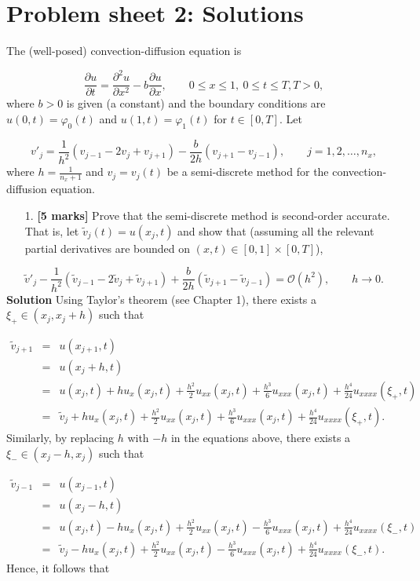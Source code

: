 \documentclass[12pt,a4paper]{article}
\begin{document}
\section{Problem sheet 2: Solutions}
The (well-posed) convection-diffusion equation is 

\[
\frac{\partial u}{\partial t} = \frac{\partial^2 u}{\partial x^2} - b \frac{\partial u}{\partial x}, \qquad 0 \leq x \leq 1, \: 0 \leq t \leq T, T > 0,
\]
where $b > 0$ is given (a constant) and the boundary conditions are $u(0,t) = \varphi_0(t)$ and $u(1,t) = \varphi_1(t)$ for $t \in [0, T]$.  Let 

\[
v'_j = \frac{1}{h^2}\left(v_{j-1} - 2v_j + v_{j+1}   \right) - \frac{b}{2h}\left(v_{j+1}  - v_{j-1}   \right), \qquad j =  1, 2,  \ldots, n_x,
\]
where $h = \displaystyle{\frac{1}{n_x + 1}}$ and $v_j = v_j(t)$ be a semi-discrete method for the convection-diffusion equation.

\begin{itemize}
\item[1. ] \textbf{[5 marks]} Prove that the semi-discrete method is second-order accurate.  That is, let $\widetilde{v}_j(t) =  u(x_j,t)$ and show that (assuming all the relevant partial derivatives are bounded on $(x,t) \in [0, 1]\times [0, T]$),

\end{itemize}
\[
\widetilde{v}'_j - \frac{1}{h^2}\left(\widetilde{v}_{j-1} - 2\widetilde{v}_j + \widetilde{v}_{j+1}   \right) + \frac{b}{2h}\left(\widetilde{v}_{j+1}  - \widetilde{v}_{j-1}   \right) = \mathcal{O}\left(h^2 \right), \qquad h \to 0.
\]
\textbf{Solution}  Using Taylor's theorem (see Chapter 1), there exists a $\xi_+ \in (x_j, x_j + h)$  such that


\begin{eqnarray*}
\widetilde{v}_{j + 1} &=& u(x_{j+1},t) \\
&=&u(x_j + h,t) \\
&=& u(x_j,t) +  hu_x(x_j,t) + \frac{h^2}{2}u_{xx}(x_j,t) + \frac{h^3}{6}u_{xxx}(x_j,t) + \frac{h^4}{24}u_{xxxx} (\xi_+,t) \\
&=& \widetilde{v}_{j} +  hu_x(x_j,t) + \frac{h^2}{2}u_{xx}(x_j,t) + \frac{h^3}{6}u_{xxx}(x_j,t) + \frac{h^4}{24}u_{xxxx} (\xi_+,t).
\end{eqnarray*}
Similarly, by replacing $h$ with $-h$ in the equations above,  there exists a $\xi_- \in (x_j - h, x_j)$  such that


\begin{eqnarray*}
\widetilde{v}_{j - 1} &=& u(x_{j-1},t) \\
&=&u(x_j - h,t) \\
&=& u(x_j,t) -  hu_x(x_j,t) + \frac{h^2}{2}u_{xx}(x_j,t) - \frac{h^3}{6}u_{xxx}(x_j,t) + \frac{h^4}{24}u_{xxxx} (\xi_-,t) \\
&=& \widetilde{v}_{j} -  hu_x(x_j,t) + \frac{h^2}{2}u_{xx}(x_j,t) - \frac{h^3}{6}u_{xxx}(x_j,t) + \frac{h^4}{24}u_{xxxx} (\xi_-,t).
\end{eqnarray*}
Hence, it follows that
\end{document}
